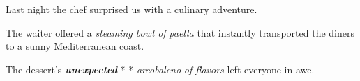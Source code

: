 \documentclass[11pt,a4paper]{article}
\begin{document}
Last night the chef surprised us with a culinary adventure.

The waiter offered a  \textit{steaming bowl of } \textit{paella}  that instantly transported the diners to a sunny Mediterranean coast.

The dessert’s  \textit{\textbf{unexpected}} * * \textit{arcobaleno} \textit{ of flavors}  left everyone in awe.
\end{document}
